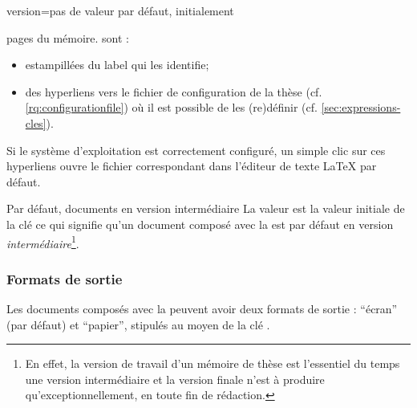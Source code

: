 {\begin{docKey}{version}{=\textbar{}\textbar{}\textbar{}}{pas
      de valeur par défaut, initialement }
\begin{description}
\begin{itemize}
\begin{enumerate}
\begin{enumerate}
{              pages du mémoire.} sont :
            \begin{itemize}
            \item estampillées du label qui les identifie;
            \item des hyperliens vers le fichier de configuration de la thèse
              (cf.  \vref{rq:configurationfile}) où il est possible de les
              (re)définir (cf. \vref{sec:expressions-cles}).
            \end{itemize}
          \end{enumerate}
          Si le système d'exploitation est correctement configuré, un simple
          clic sur ces hyperliens ouvre le fichier correspondant dans l'éditeur
          de texte \LaTeX{} par défaut.
        \end{enumerate}
      \end{itemize}
    \end{description}
  \end{docKey}
}
\begin{dbwarning}{Par défaut, documents en version intermédiaire}{}
  La valeur  est la valeur initiale de la clé
   ce qui signifie qu'un document composé avec la \yatcl{} est
  par défaut en version \emph{intermédiaire}\footnote{En effet, la version de
    travail d'un mémoire de thèse est l'essentiel du temps une version
    intermédiaire et la version finale n'est à produire qu'exceptionnellement,
    en toute fin de rédaction.}.
\end{dbwarning}

\subsubsection{Formats de sortie}
\label{sec:formats-de-sortie}

Les documents composés avec la \yatcl{} peuvent avoir deux formats de sortie :
\enquote{écran} (par défaut) et \enquote{papier}, stipulés au moyen de la clé
.

